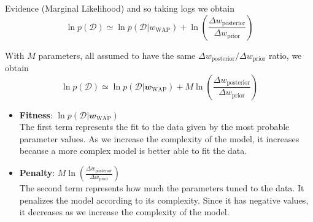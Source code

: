 \documentclass{bredelebeamer}
\begin{document}
\begin{frame}{Evidence (Marginal Likelihood)}
  and so taking logs we obtain
  \begin{equation}
    \ln p(\mathcal{D})
    \simeq \ln p(\mathcal{D}|w_{\mathrm{WAP}})
    + \ln \left(
      \frac{\Delta w_{\textrm{posterior}}}{\Delta w_{\textrm{prior}}}
    \right)
  \end{equation}

  With $M$ parameters, all assumed to have the same
  $\Delta w_{\textrm{posterior}} / \Delta w_{\textrm{prior}}$ ratio, we obtain
  \begin{equation}
    \ln p(\mathcal{D})
    \simeq \ln p(\mathcal{D}|\mathbfit{w}_{\mathrm{WAP}})
    + M \ln \left(
      \frac{\Delta w_{\textrm{posterior}}}{\Delta w_{\textrm{prior}}}
    \right)
  \end{equation}

  \begin{itemize}
    \item \textbf{Fitness}:
          $\ln p(\mathcal{D}|\mathbfit{w}_{\mathrm{WAP}})$ \\
          The first term represents the fit to the data given by the most
          probable parameter values. As we increase the complexity of the model,
          it increases because a more complex model is better able to fit the data.
    \item \textbf{Penalty}:
          $M \ln \left(
            \frac{\Delta w_{\textrm{posterior}}}{\Delta w_{\textrm{prior}}}
          \right)$ \\
          The second term represents how much the parameters tuned to the data.
          It penalizes the model according to its complexity. Since it has negative
          values, it decreases as we increase the complexity of the model.
  \end{itemize}
\end{frame}
\end{document}
